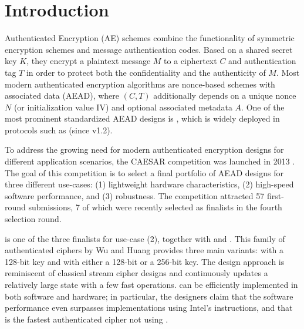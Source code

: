 
\section{Introduction}
\label{sec/Introduction}

Authenticated Encryption (AE) schemes combine the functionality of symmetric encryption schemes and message authentication codes.
Based on a shared secret key $K$, they encrypt a plaintext message $M$ to a ciphertext $C$ and authentication tag $T$ in order to protect both the confidentiality and the authenticity of $M$.
Most modern authenticated encryption algorithms are nonce-based schemes with associated data (AEAD),
where $(C, T)$ additionally depends on a unique nonce $N$ (or initialization value IV) and optional associated metadata $A$.
One of the most prominent standardized AEAD designs is  \cite{indocryptMcGrewV04,nistDworkin07},
which is widely deployed in protocols such as  (since v1.2).

To address the growing need for modern authenticated encryption designs for different application scenarios, 
the CAESAR competition was launched in 2013 \cite{CAESAR}.
The goal of this competition is to select a final portfolio of AEAD designs for three different use-cases:
(1) lightweight hardware characteristics,
(2) high-speed software performance, and
(3) robustness.
The competition attracted 57 first-round submissions, 7 of which were recently selected as finalists in the fourth selection round.

\MORUS is one of the three finalists for use-case (2), together with  and .
This family of authenticated ciphers by Wu and Huang \cite{MORUS} provides three main variants:
\MORUS[640] with a 128-bit key and \MORUS[1280] with either a 128-bit or a 256-bit key.
The design approach is reminiscent of classical stream cipher designs and
continuously updates a relatively large state with a few fast operations.
\MORUS can be efficiently implemented in both software and hardware;
in particular, the designers claim that the software performance even surpasses
 implementations using Intel's  instructions,
and that \MORUS is the fastest authenticated cipher not using  \cite{MORUS}.

